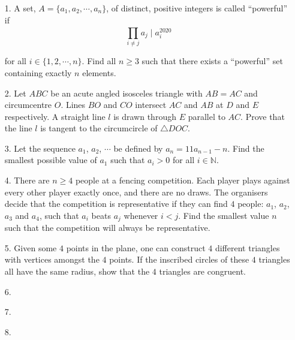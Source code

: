 \documentclass{article}
\begin{document}
\begin{enumerate}

\bigskip
\item[1.] %
A set, $A=\{a_1, a_2, \cdots, a_n\}$, of distinct, positive integers is called ``powerful'' if
$$\prod_{i \neq j}^{}a_j \mid a_i^{2020}$$ 

for all $i \in \{1, 2, \cdots, n\}$. Find all $n \ge 3$ such that there exists a ``powerful'' set containing exactly $n$ elements.

\medskip
\item[2.] %
Let $ABC$ be an acute angled isosceles triangle with $AB = AC$ and circumcentre $O$. Lines $BO$ and $CO$ intersect $AC$ and $AB$ at $D$ and $E$ respectively.
A straight line $l$ is drawn through $E$ parallel to $AC$. Prove that the line $l$ is tangent to the circumcircle of $\triangle DOC$.

\medskip
\item[3.] %
Let the sequence $a_1$, $a_2$, $\cdots$ be defined by $a_n = 11a_{n - 1} - n$. Find the smallest possible value of $a_1$ such that $a_i > 0$ for all $i \in \mathbb{N}$.

\medskip
\item[4.] %
There are $n \ge 4$ people at a fencing competition. Each player plays against every other player exactly once, and
there are no draws. The organisers decide that the competition is representative if they can find $4$ people: $a_1$,
$a_2$, $a_3$ and $a_4$, such that $a_i$ beats $a_j$ whenever $i < j$. Find the smallest value $n$ such that the
competition will always be representative.

\medskip
\item[5.] %
Given some $4$ points in the plane, one can construct $4$ different triangles with vertices amongst the $4$ points. If the inscribed circles
of these $4$ triangles all have the same radius, show that the $4$ triangles are congruent. 

\medskip
\item[6.] %

\medskip
\item[7.] %

\medskip
\item[8.] %

\end{enumerate}
\end{document}
